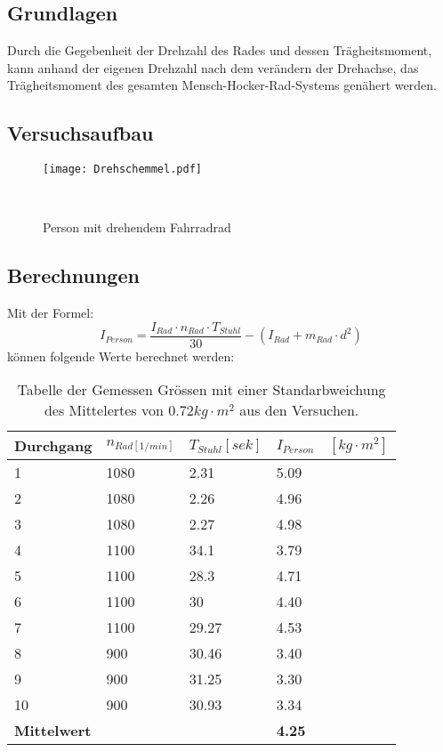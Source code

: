 \documentclass{article}
\begin{document}
\subsection{Grundlagen}
Durch die Gegebenheit der Drehzahl des Rades und dessen Trägheitsmoment, kann anhand der eigenen
Drehzahl nach dem verändern der Drehachse, das Trägheitsmoment des gesamten 
Mensch-Hocker-Rad-Systems genähert werden.

\subsection{Versuchsaufbau}
\begin{figure}[h]
\center

\texttt{[image: Drehschemmel.pdf]} 
\caption{Person mit drehendem Fahrradrad}
\

\end{figure}
\newpage
\subsection{Berechnungen}
Mit der Formel:
\begin{equation}
I_{Person}=\frac{I_{Rad}\cdot n_{Rad}\cdot T_{Stuhl}}{30}-(I_{Rad}+m_{Rad}\cdot d^2)
\end{equation}
können folgende Werte berechnet werden:
\begin{table}[H]
   \center
    \begin{tabular}{|l|l|l|l|}
        \hline
     
        Durchgang & $n_{Rad[1/min]}$ & $T_{Stuhl}[sek]$ & $I_{Person}\quad [kg\cdot m^2]$ \\ \hline
        1         & 1080         & 2.31    & 5.09      \\ 
        2         & 1080         & 2.26    & 4.96       \\ 
        3         & 1080         & 2.27    & 4.98        \\ 
        4         & 1100         & 34.1    & 3.79        \\ 
        5         & 1100         & 28.3    & 4.71        \\ 
        6         & 1100         & 30      & 4.40        \\ 
        7         & 1100         & 29.27   & 4.53        \\ 
        8         & 900          & 30.46   & 3.40        \\ 
        9         & 900          & 31.25   & 3.30        \\ 
        10        & 900          & 30.93   & 3.34        \\ \hline
        	\textbf{Mittelwert}&&&\textbf{4.25}\\
        \hline
    \end{tabular}
    \caption{Tabelle der Gemessen Grössen mit einer Standarbweichung des Mittelertes von 0.72$ kg\cdot m^2$ aus den Versuchen.}
\end{table}
\end{document}
